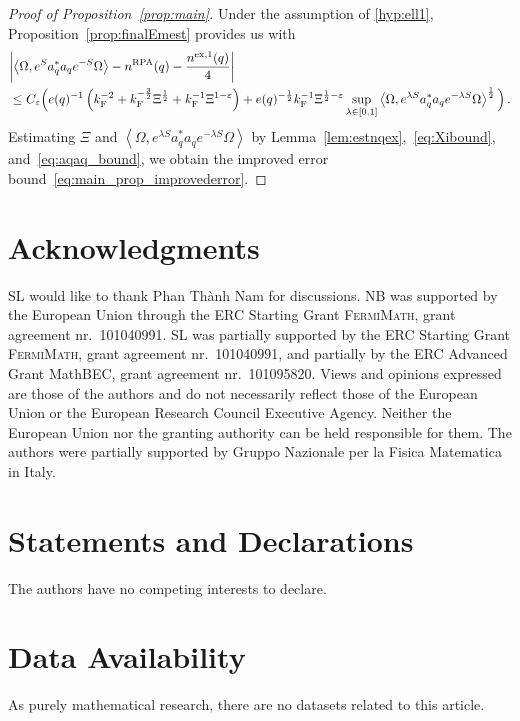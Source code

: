 \documentclass[12pt,a4paper]{article}
\numberwithin{equation}{section}
\newcommand{\1}{\mathbb{I}}
\newcommand{\ex}{\mathrm{ex}}
\newcommand{\F}{\mathrm{F}}
\newcommand{\kF}{k_\F}
\newcommand{\half}{\frac{1}{2}}
\newcommand{\eva}[1]{\left\langle #1 \right\rangle}
\theoremstyle{plain}
\theoremstyle{definition}
\theoremstyle{remark}
\theoremstyle{plain}
\theoremstyle{definition}
\theoremstyle{remark}
\begin{document}
\begin{proof}[Proof of Proposition~\ref{prop:main}]
\bigskip

Under the assumption of \eqref{hyp:ell1}, Proposition~\ref{prop:finalEmest} provides us with
\begin{align} \label{eq:main_errorbound_with_Xi_subcoulomb}
	& \abs{\eva{\Omega, e^{S} a_q^* a_q e^{-S} \Omega} - n^{\textnormal{RPA}}(q)
- \frac{n^{\ex,1}(q)}{4}
	}  \\
	& \le
	C_\varepsilon
		\Big(  e(q)^{-1} \left( \kF^{-2}
		+ \kF^{-\frac{3}{2}} \Xi^\half
		+ \kF^{-1} \Xi^{1-\varepsilon} \right)  + e(q)^{-\half} \kF^{-1} \Xi^{\half - \varepsilon} \sup_{\lambda \in [0,1]} \eva{\Omega, e^{\lambda S} a_q^* a_q e^{-\lambda S} \Omega}^{\half} \Big) \,. \nonumber
\end{align}
Estimating $ \Xi $ and $ \eva{\Omega, e^{\lambda S} a_q^* a_q e^{-\lambda S} \Omega} $ by Lemma~\ref{lem:estnqex},~\eqref{eq:Xibound}, and~\eqref{eq:aqaq_bound}, we obtain the improved error bound~\eqref{eq:main_prop_improvederror}.
\end{proof}




\section*{Acknowledgments}
SL would like to thank Phan Thành Nam for discussions. NB was supported by the European Union through the ERC Starting Grant \textsc{FermiMath}, grant agreement nr.~101040991. SL was partially supported by the ERC Starting Grant \textsc{FermiMath}, grant agreement nr.~101040991, and partially by the ERC Advanced Grant MathBEC, grant agreement nr.~101095820. Views and opinions expressed are those of the authors and do not necessarily reflect those of the European Union or the European Research Council Executive Agency. Neither the European Union nor the granting authority can be held responsible for them. The authors were partially supported by Gruppo Nazionale per la Fisica Matematica in Italy.

\section*{Statements and Declarations}
The authors have no competing interests to declare.

\section*{Data Availability}
As purely mathematical research, there are no datasets related to this article.

\footnotesize

{}
\end{document}
